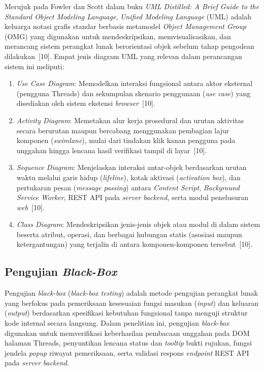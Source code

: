 \documentclass[12pt,a4paper,twoside]{report}
\begin{document}
Merujuk pada Fowler dan Scott dalam buku \textit{UML Distilled: A Brief Guide to the Standard Object Modeling Language}, \textit{Unified Modeling Language} (UML) adalah keluarga notasi grafis standar berbasis metamodel \textit{Object Management Group} (OMG) yang digunakan untuk mendeskripsikan, memvisualisasikan, dan merancang sistem perangkat lunak berorientasi objek sebelum tahap pengodean dilakukan~[10]. Empat jenis diagram UML yang relevan dalam perancangan sistem ini meliputi:
\begin{enumerate}[leftmargin=0.8cm,itemsep=2pt,topsep=2pt]
  \item \textit{Use Case Diagram}: Memodelkan interaksi fungsional antara aktor eksternal (pengguna Threads) dan sekumpulan skenario penggunaan (\textit{use case}) yang disediakan oleh sistem ekstensi \textit{browser}~[10].
  \item \textit{Activity Diagram}: Memetakan alur kerja prosedural dan urutan aktivitas secara berurutan maupun bercabang menggunakan pembagian lajur komponen (\textit{swimlane}), mulai dari tindakan klik kanan pengguna pada unggahan hingga lencana hasil verifikasi tampil di layar~[10].
  \item \textit{Sequence Diagram}: Menjelaskan interaksi antar-objek berdasarkan urutan waktu melalui garis hidup (\textit{lifeline}), kotak aktivasi (\textit{activation box}), dan pertukaran pesan (\textit{message passing}) antara \textit{Content Script}, \textit{Background Service Worker}, REST API pada \textit{server} \textit{backend}, serta modul penelusuran \textit{web}~[10].
  \item \textit{Class Diagram}: Mendeskripsikan jenis-jenis objek atau modul di dalam sistem beserta atribut, operasi, dan berbagai hubungan statis (asosiasi maupun ketergantungan) yang terjalin di antara komponen-komponen tersebut~[10].
\end{enumerate}

\subsection{Pengujian \textit{Black-Box}}

Pengujian \textit{black-box} (\textit{black-box testing}) adalah metode pengujian perangkat lunak yang berfokus pada pemeriksaan kesesuaian fungsi masukan (\textit{input}) dan keluaran (\textit{output}) berdasarkan spesifikasi kebutuhan fungsional tanpa menguji struktur kode internal secara langsung. Dalam penelitian ini, pengujian \textit{black-box} digunakan untuk memverifikasi keberhasilan pembacaan unggahan pada DOM halaman Threads, penyuntikan lencana status dan \textit{tooltip} bukti rujukan, fungsi jendela \textit{popup} riwayat pemeriksaan, serta validasi respons \textit{endpoint} REST API pada \textit{server} \textit{backend}.
\end{document}
